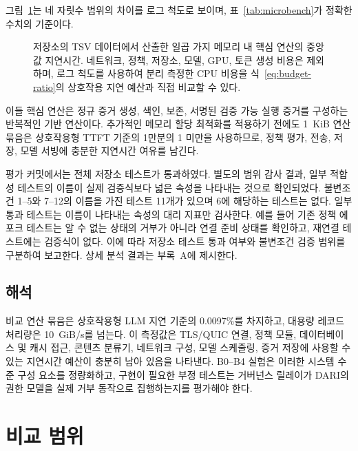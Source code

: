 \documentclass[10pt]{article}
\begin{document}
그림~\ref{fig:primitive-latency}는 네 자릿수 범위의 차이를 로그 척도로 보이며, 표~\ref{tab:microbench}가 정확한 수치의 기준이다.

\begin{figure}[H]
  \centering
  
  \caption{저장소의 TSV 데이터에서 산출한 일곱 가지 메모리 내 핵심 연산의 중앙값 지연시간. 네트워크, 정책, 저장소, 모델, GPU, 토큰 생성 비용은 제외하며, 로그 척도를 사용하여 분리 측정한 CPU 비용을 식~\ref{eq:budget-ratio}의 상호작용 지연 예산과 직접 비교할 수 있다.}
  \label{fig:primitive-latency}
\end{figure}

이들 핵심 연산은 정규 증거 생성, 색인, 보존, 서명된 검증 가능 실행 증거를 구성하는 반복적인 기반 연산이다. 추가적인 메모리 할당 최적화를 적용하기 전에도 1~KiB 연산 묶음은 상호작용형 TTFT 기준의 1만분의 1 미만을 사용하므로, 정책 평가, 전송, 저장, 모델 서빙에 충분한 지연시간 여유를 남긴다.

평가 커밋에서는 전체 저장소 테스트가 통과하였다. 별도의 범위 감사 결과, 일부 적합성 테스트의 이름이 실제 검증식보다 넓은 속성을 나타내는 것으로 확인되었다. 불변조건 1--5와 7--12의 이름을 가진 테스트 11개가 있으며 6에 해당하는 테스트는 없다. 일부 통과 테스트는 이름이 나타내는 속성의 대리 지표만 검사한다. 예를 들어 기존 정책 에포크 테스트는 알 수 없는 상태의 거부가 아니라 연결 준비 상태를 확인하고, 재연결 테스트에는 검증식이 없다. 이에 따라 저장소 테스트 통과 여부와 불변조건 검증 범위를 구분하여 보고한다. 상세 분석 결과는 부록~A에 제시한다.

\subsection{해석}

비교 연산 묶음은 상호작용형 LLM 지연 기준의 0.0097\%를 차지하고, 대용량 레코드 처리량은 10~GiB/s를 넘는다. 이 측정값은 TLS/QUIC 연결, 정책 모듈, 데이터베이스 및 캐시 접근, 콘텐츠 분류기, 네트워크 구성, 모델 스케줄링, 증거 저장에 사용할 수 있는 지연시간 예산이 충분히 남아 있음을 나타낸다. B0--B4 실험은 이러한 시스템 수준 구성 요소를 정량화하고, 구현이 필요한 부정 테스트는 거버넌스 릴레이가 DARI의 권한 모델을 실제 거부 동작으로 집행하는지를 평가해야 한다.

\section{비교 범위}
\end{document}
